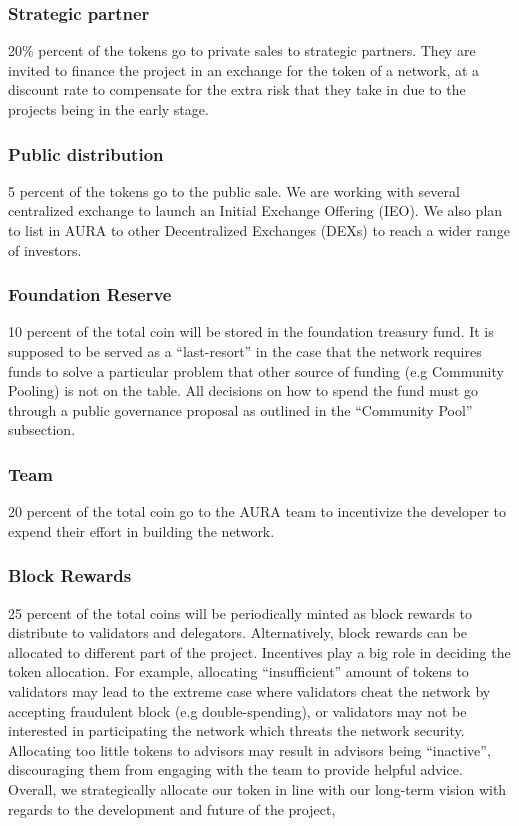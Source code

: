 \documentclass[11pt, titlepage]{article}
\begin{document}
\subsubsection{Strategic partner}
20\% percent of the tokens go to private sales to strategic partners. They are invited to finance the project in an exchange for the token of a network, at a discount rate to compensate for the extra risk that they take in due to the projects being in the early stage.
 
\subsubsection{Public distribution}
5 percent of the tokens go to the public sale. We are working with several centralized exchange to launch an Initial Exchange Offering (IEO). We also plan to list in AURA to other Decentralized Exchanges (DEXs) to reach a wider range of investors. 

\subsubsection{Foundation Reserve}
10 percent of the total coin will be stored in the foundation treasury fund. It is supposed to be served as a “last-resort” in the case that the network requires funds to solve a particular problem that other source of funding (e.g Community Pooling) is not on the table. All decisions on how to spend the fund must go through a public governance proposal as outlined in the “Community Pool” subsection.
 
\subsubsection{Team}
20 percent of the total coin go to the AURA team to incentivize the developer to expend their effort in building the network.
 
\subsubsection{Block Rewards}
25 percent of the total coins will be periodically minted as block rewards to distribute to validators and delegators.
Alternatively, block rewards can be allocated to different part of the project. Incentives play a big role in deciding the token allocation. For example, allocating “insufficient” amount of tokens to validators may lead to the extreme case where validators cheat the network by accepting fraudulent block (e.g double-spending), or validators may not be interested in participating the network which threats the network security. Allocating too little tokens to advisors may result in advisors being “inactive”, discouraging them from engaging with the team to provide helpful advice. Overall, we strategically allocate our token in line with our long-term vision with regards to the development and future of the project, 
\end{document}
